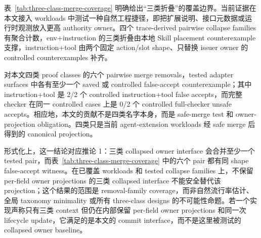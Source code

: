 \documentclass[UTF8,a4paper,11pt]{ctexart}
\begin{document}
表~\ref{tab:three-class-merge-coverage} 明确给出“三类折叠”的覆盖边界。当前证据在本文接入 workloads 中测试一种自然工程捷径，即把扩展说明、接口元数据或运行时观测放入更高 authority owner。四个 trace-derived pairwise collapse families 有聚合计数，env+instruction 的三类折叠由本地 Skill placement counterexample 支撑，instruction+tool 由两个固定 action/slot shape、只替换 issuer owner 的 controlled counterexamples 补齐。

对本文四类 proof classes 的六个 pairwise merge removals，tested adapter surfaces 中各有至少一个 saved 或 controlled false-accept counterexample；其中 instruction+tool 是 2/2 个 controlled instruction+tool false accepts，而完整 checker 在同一 controlled cases 上是 0/2 个 controlled full-checker unsafe accepts。相应地，本文的贡献不是四类名字本身，而是 safe-merge test 和 owner-projection obligation。四类只是当前 agent-extension workloads 经 safe merge 后得到的 canonical projection。

形式化上，这一结论对应推论 1：三类 collapsed owner interface 会合并至少一个 tested pair，而表~\ref{tab:three-class-merge-coverage} 中的六个 pair 都有同 shape false-accept witness。在已覆盖 workloads 和 tested collapse families 上，不保留 per-field owner projections 的三类 collapsed interface 不能安全替代该 projection；这个结果的范围是 removal-family coverage，而非自然流行率估计、全局 taxonomy minimality 或所有 three-class designs 的不可能性命题。若一个实现声称只有三类 context 但仍在内部保留 per-field owner projections 和同一次 lifecycle update，它满足的是本文的 commit interface，而不是这里被测试的 collapsed owner baseline。
\end{document}
